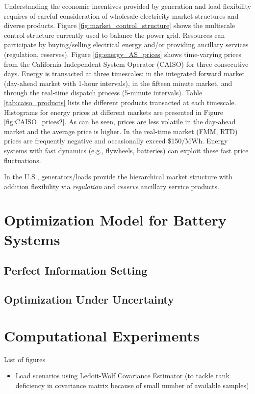 \documentclass[11pt,twoside]{article}
\begin{document}
Understanding the economic incentives provided by generation and load flexibility requires of careful consideration of wholesale electricity market structures and diverse products. Figure \ref{fig:market_control_structure} shows the multiscale control structure currently used to balance the power grid. Resources can participate by buying/selling electrical energy and/or providing ancillary services (regulation, reserves). Figure \ref{fig:energy_AS_prices} shows time-varying prices from the California Independent System Operator (CAISO) for three consecutive days. Energy is transacted at three timescales: in the integrated forward market (day-ahead market with 1-hour intervals), in the fifteen minute market, and through the real-time dispatch process (5-minute intervals). Table \ref{tab:caiso_products} lists the different products transacted at each timescale. Histograms for energy prices at different markets are presented in Figure \ref{fig:CAISO_prices2}. As can be seen, prices are less volatile in the day-ahead market and the average price is higher. In the real-time market (FMM, RTD) prices are frequently negative and occasionally exceed \$150/MWh. Energy systems with fast dynamics (e.g., flywheels, batteries) can exploit these fast price fluctuations.

In the U.S., generators/loads provide the hierarchical market structure with addition flexibility via \emph{regulation} and \emph{reserve} ancillary service products. 

\section{Optimization Model for Battery Systems}\label{sec:model}
\subsection{Perfect Information Setting}
\subsection{Optimization Under Uncertainty}

\section{Computational Experiments}\label{sec:exp}
List of figures
\begin{itemize}
\item Load scenarios using Ledoit-Wolf Covariance Estimator (to tackle rank deficiency in covariance matrix because of small number of available samples)
\end{itemize}
\end{document}
